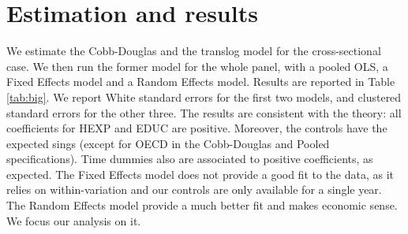 \documentclass[12pt,a4paper]{article}\usepackage[]{graphicx}\usepackage[]{color}
\begin{document}
\section{Estimation and results}





We estimate the Cobb-Douglas and the translog model for the cross-sectional case. We then run the former model for the whole panel, with a pooled OLS, a Fixed Effects model and a Random Effects model. Results are reported in Table \ref{tab:big}. We report White standard errors for the first two models, and clustered standard errors for the other three. The results are consistent with the theory: all coefficients for HEXP and EDUC are positive. Moreover, the controls have the expected sings (except for OECD in the Cobb-Douglas and Pooled specifications). Time dummies also are associated to positive coefficients, as expected. The Fixed Effects model does not provide a good fit to the data, as it relies on within-variation and our controls are only available for a single year. The Random Effects model provide a much better fit and makes economic sense. We focus our analysis on it.

\end{document}
